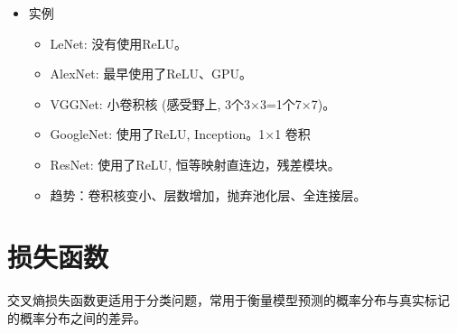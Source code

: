 \documentclass[
12pt, %
a4paper, 
oneside, %
headinclude,footinclude, %
]{scrartcl}
\begin{document}
\begin{itemize}
\item 实例
\begin{itemize}
\item LeNet: 没有使用ReLU。
\item AlexNet: 最早使用了ReLU、GPU。
\item VGGNet: 小卷积核 (感受野上, 3个3×3=1个7×7)。
\item GoogleNet: 使用了ReLU, Inception。1×1 卷积
\item ResNet: 使用了ReLU, 恒等映射直连边，残差模块。
\item 趋势：卷积核变小、层数增加，抛弃池化层、全连接层。
\end{itemize}
\end{itemize}

\section{损失函数}
交叉熵损失函数更适用于分类问题，常用于衡量模型预测的概率分布与真实标记
的概率分布之间的差异。
\end{document}
